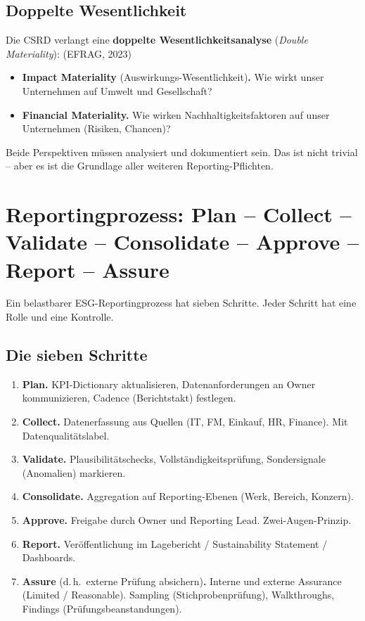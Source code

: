 \documentclass[11pt,a4paper,oneside]{article}
\newcommand{\fachbegriff}[1]{\textbf{#1}}
\newcommand{\quelle}[1]{{\footnotesize\color{lpGray}(#1)}}
\begin{document}
\subsection{Doppelte Wesentlichkeit}

Die CSRD verlangt eine \fachbegriff{doppelte Wesentlichkeitsanalyse} (\emph{Double Materiality}): \quelle{EFRAG, 2023}

\begin{itemize}
  \item \textbf{Impact Materiality} (Auswirkungs-Wesentlichkeit)\textbf{.} Wie wirkt unser Unternehmen auf Umwelt und Gesellschaft?
  \item \textbf{Financial Materiality.} Wie wirken Nachhaltigkeitsfaktoren auf unser Unternehmen (Risiken, Chancen)?
\end{itemize}

Beide Perspektiven müssen analysiert und dokumentiert sein. Das ist nicht trivial -- aber es ist die Grundlage aller weiteren Reporting-Pflichten.

\section{Reportingprozess: Plan -- Collect -- Validate -- Consolidate -- Approve -- Report -- Assure}

Ein belastbarer ESG-Reportingprozess hat sieben Schritte. Jeder Schritt hat eine Rolle und eine Kontrolle.

\subsection{Die sieben Schritte}

\begin{enumerate}
  \item \fachbegriff{Plan.} KPI-Dictionary aktualisieren, Datenanforderungen an Owner kommunizieren, Cadence (Berichtstakt) festlegen.
  \item \fachbegriff{Collect.} Datenerfassung aus Quellen (IT, FM, Einkauf, HR, Finance). Mit Datenqualitätslabel.
  \item \fachbegriff{Validate.} Plausibilitätschecks, Vollständigkeitsprüfung, Sondersignale (Anomalien) markieren.
  \item \fachbegriff{Consolidate.} Aggregation auf Reporting-Ebenen (Werk, Bereich, Konzern).
  \item \fachbegriff{Approve.} Freigabe durch Owner und Reporting Lead. Zwei-Augen-Prinzip.
  \item \fachbegriff{Report.} Veröffentlichung im Lagebericht / Sustainability Statement / Dashboards.
  \item \fachbegriff{Assure} (d.\,h.\ externe Prüfung absichern)\textbf{.} Interne und externe Assurance (Limited / Reasonable). Sampling (Stichprobenprüfung), Walkthroughs, Findings (Prüfungsbeanstandungen).
\end{enumerate}
\end{document}
